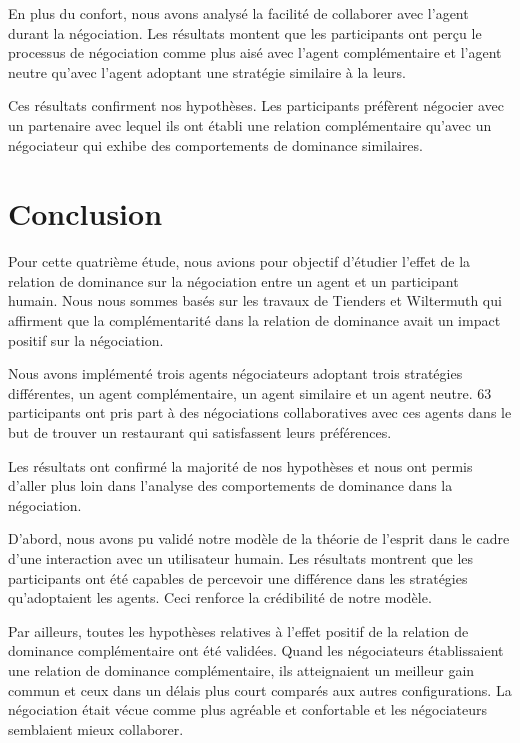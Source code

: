 	En plus du confort, nous avons analysé la facilité de collaborer avec l'agent durant la négociation. Les résultats montent que les participants ont perçu le processus de négociation comme plus aisé avec l'agent complémentaire et l'agent neutre qu'avec l'agent adoptant une stratégie similaire à la leurs. 
	
	Ces résultats confirment nos hypothèses. Les participants préfèrent négocier avec un partenaire avec lequel ils ont établi une relation complémentaire qu'avec un négociateur qui exhibe des comportements de dominance similaires. 
	
	
	\section{Conclusion}
	Pour cette quatrième étude, nous avions pour objectif d'étudier l'effet de la relation de dominance sur la négociation entre un agent et un participant humain. Nous nous sommes basés sur les travaux de Tienders et Wiltermuth \cite{wiltermuth2009benefits,tiedens2003domer}qui affirment que la complémentarité dans la relation de dominance avait un impact positif sur la négociation. 
	
	Nous avons implémenté trois agents négociateurs adoptant trois stratégies différentes, un agent complémentaire, un agent similaire et un agent neutre. 
	63 participants ont pris part à  des négociations collaboratives avec ces agents dans le but de trouver un restaurant qui satisfassent leurs préférences. 
	
	Les résultats ont confirmé la majorité de nos hypothèses et nous ont permis d'aller plus loin dans l'analyse des comportements de dominance dans la négociation. 
	
	D'abord, nous avons pu validé notre modèle de la théorie de l'esprit dans le cadre d'une interaction avec un utilisateur humain. 
	Les résultats montrent que les participants ont été capables de percevoir une différence dans les stratégies qu'adoptaient les agents. Ceci renforce la crédibilité de notre modèle. 
	
	Par ailleurs, toutes les hypothèses relatives à l'effet positif de la relation de dominance complémentaire ont été validées. Quand les négociateurs établissaient une relation de dominance complémentaire, ils atteignaient un meilleur gain commun et ceux dans un délais plus court comparés aux autres configurations. La négociation était vécue comme plus agréable et confortable et les négociateurs semblaient mieux collaborer. 
	
